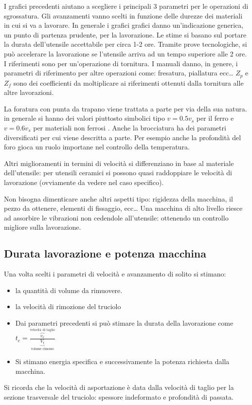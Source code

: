 I grafici precedenti  aiutano a scegliere i principali 3 parametri per le operazioni di sgrossatura.
Gli avanzamenti vanno scelti in funzione delle durezze dei materiali in cui si va a lavorare.
In generale i grafici grafici danno un'indicazione generica, un punto di partenza prudente, per la lavorazione. Le stime si basano sul portare la durata dell'utensile accettabile per circa 1-2 ore.
Tramite prove tecnologiche, si può accelerare la lavorazione se l'utensile arriva ad un tempo superiore alle 2 ore.
I riferimenti sono per un'operazione di tornitura. I manuali danno, in genere, i parametri di riferimento per altre operazioni come: fresatura, piallatura ecc\dots
{}
$Z_p$ e $Z_f$ sono dei coefficienti da moltiplicare ai riferimenti ottenuti dalla tornitura alle altre lavorazioni.

La foratura con punta da trapano viene trattata a parte per via della sua natura. in generale si hanno dei valori piuttosto simbolici tipo $v = 0.5v_s$ per il ferro e $v = 0.6v_s$ per materiali non ferrosi \todo{\\verifica}.
Anche la brocciatura ha dei parametri diversificati per cui viene descritta a parte.
Per esempio anche la profondità del foro gioca un ruolo importane nel controllo della temperatura.

Altri miglioramenti in termini di velocità si differenziano in base al materiale dell'utensile: per utensili ceramici si possono quasi raddoppiare le velocità di lavorazione (ovviamente da vedere nel caso specifico).

Non bisogna dimenticare anche altri aspetti tipo: rigidezza della macchina, il pezzo da ottenere, elementi di fissaggio, ecc\dots
Una macchina di alto livello riesce ad assorbire le vibrazioni non cedendole all'utensile: ottenendo un controllo migliore sulla lavorazione.

\subsection{Durata lavorazione e potenza macchina}
Una volta scelti i parametri di velocità e avanzamento di solito si stimano:
\begin{itemize}
\item la quantità di volume da rimuovere.
\item la velocità di rimozione del truciolo
\item Dai parametri precedenti si può stimare la durata della lavorazione come $t_c = \frac{\overbrace{v_c}^{\text{velocità di taglio}}}{\underbrace{V_t}_{\text{volume rimosso}}}$
\item Si stimano energia specifica e successivamente la potenza richiesta dalla macchina.
\end{itemize}
Si ricorda che la velocità di asportazione è data dalla velocità di taglio per la sezione trasversale del truciolo: spessore indeformato e profondità di passata.

